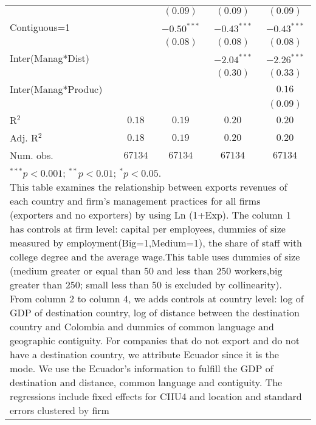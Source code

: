 \documentclass{article}
\begin{document}
\begin{table}
\begin{center}
\begin{normalsize}
\begin{tabular}{l c c c c}
                        &              & $(0.09)$      & $(0.09)$      & $(0.09)$      \\
Contiguous=1            &              & $-0.50^{***}$ & $-0.43^{***}$ & $-0.43^{***}$ \\
                        &              & $(0.08)$      & $(0.08)$      & $(0.08)$      \\
Inter(Manag*Dist)       &              &               & $-2.04^{***}$ & $-2.26^{***}$ \\
                        &              &               & $(0.30)$      & $(0.33)$      \\
Inter(Manag*Produc)     &              &               &               & $0.16$        \\
                        &              &               &               & $(0.09)$      \\
\hline
R$^2$                   & $0.18$       & $0.19$        & $0.20$        & $0.20$        \\
Adj. R$^2$              & $0.18$       & $0.19$        & $0.20$        & $0.20$        \\
Num. obs.               & $67134$      & $67134$       & $67134$       & $67134$       \\
\hline
\multicolumn{5}{l}{\scriptsize{\parbox{1\linewidth}{\vspace{3pt}$^{***}p<0.001$; $^{**}p<0.01$; $^{*}p<0.05$. \\ This table examines the relationship between exports revenues of each country and firm's management practices for all firms (exporters and no exporters) by using Ln (1+Exp). The column 1 has controls at firm level: capital per employees, dummies of size measured by employment(Big=1,Medium=1), the share of staff with college degree and the average wage.This table uses dummies of size (medium greater or equal than 50 and less than 250 workers,big greater than 250; small less than 50 is excluded by collinearity). From column 2 to column 4, we adds controls at country level: log of GDP of destination country, log of distance between the destination country and Colombia and dummies of common language and geographic contiguity. For companies that do not export and do not have a destination country, we attribute Ecuador since it is the mode. We use the Ecuador's information to fulfill the GDP of destination and distance, common language and contiguity. The regressions include fixed effects for CIIU4 and location and standard errors clustered by firm}}}
\end{tabular}
\end{normalsize}
\label{table:coefficients}
\end{center}
\end{table}
\end{document}
